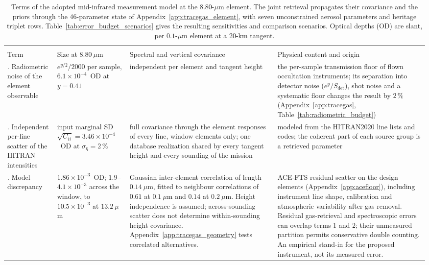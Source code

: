 \begin{table}[t]
\centering
\caption{Terms of the adopted mid-infrared measurement model at the $8.80$-$\mu$m element. The joint retrieval propagates their covariance and the priors through the 46-parameter state of Appendix~\ref{app:tracegas_element}, with seven unconstrained aerosol parameters and heritage triplet rows. Table~\ref{tab:error_budget_scenarios} gives the resulting sensitivities and comparison scenarios. Optical depths (OD) are slant, per $0.1$-$\mu$m element at a $20$-km tangent.}
\label{tab:error_budget}
\footnotesize
\setlength{\tabcolsep}{4pt}
\begin{tabular}{>{\raggedright\arraybackslash}p{3.4cm}>{\raggedright\arraybackslash}p{3.0cm}>{\raggedright\arraybackslash}p{5.0cm}>{\raggedright\arraybackslash}p{4.6cm}}
\toprule
\multicolumn{4}{l}{Terms of the primary model} \\
Term & Size at $8.80~\mu$m & Spectral and vertical covariance & Physical content and origin \\
\midrule
1. Radiometric noise of the element observable & $e^{y/2}/2000$ per sample, $6.1\times10^{-4}$~OD at $y=0.41$ & independent per element and tangent height & the per-sample transmission floor of flown occultation instruments; its separation into detector noise ($e^{y}/S_\text{det}$), shot noise and a systematic floor changes the result by $2\,\%$ (Appendix~\ref{app:tracegas}, Table~\ref{tab:radiometric_budget}) \\
2. Independent per-line scatter of the HITRAN intensities & input marginal SD $\sqrt{C_{ii}}=3.46\times10^{-4}$~OD at $\sigma_\eta=2\,\%$ & full covariance through the element responses of every line, window elements only; one database realization shared by every tangent height and every sounding of the mission & modeled from the HITRAN2020 line lists and codes; the coherent part of each source group is a retrieved parameter \\
3. Model discrepancy & $1.86\times10^{-3}$~OD; $1.9$--$4.1\times10^{-3}$ across the window, to $10.5\times10^{-3}$ at $13.2~\mu$m & Gaussian inter-element correlation of length $0.14~\mu$m, fitted to neighbour correlations of $0.61$ at $0.1~\mu$m and $0.14$ at $0.2~\mu$m. Height independence is assumed; across-sounding scatter does not determine within-sounding height covariance. Appendix~\ref{app:tracegas_geometry} tests correlated alternatives. & ACE-FTS residual scatter on the design elements (Appendix~\ref{app:acefloor}), including instrument line shape, calibration and atmospheric variability after gas removal. Residual gas-retrieval and spectroscopic errors can overlap terms 1 and 2; their unmeasured partition permits conservative double counting. An empirical stand-in for the proposed instrument, not its measured error. \\

\end{tabular}
\end{table}
